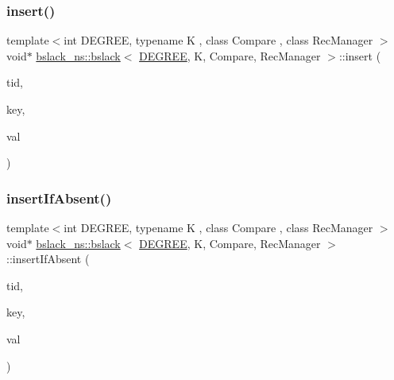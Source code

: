 \subsubsection{\texorpdfstring{insert()}{insert()}}
{\footnotesize\ttfamily template$<$int D\+E\+G\+R\+EE, typename K , class Compare , class Rec\+Manager $>$ \\
void$\ast$ \hyperlink{classbslack__ns_1_1bslack}{bslack\+\_\+ns\+::bslack}$<$ \hyperlink{brown__sigouin__abtree__kcas_2adapter_8h_a5d88b17d70c985f2f2b8e987037fd6dd}{D\+E\+G\+R\+EE}, K, Compare, Rec\+Manager $>$\+::insert (\begin{DoxyParamCaption}\item[{const int}]{tid,  }\item[{const K \&}]{key,  }\item[{void $\ast$const}]{val }\end{DoxyParamCaption})\hspace{0.3cm}{\ttfamily [inline]}}

\mbox{\label{classbslack__ns_1_1bslack_ae62b610f3793dc107e60d54b889771bb}} 
\subsubsection{\texorpdfstring{insert\+If\+Absent()}{insertIfAbsent()}}
{\footnotesize\ttfamily template$<$int D\+E\+G\+R\+EE, typename K , class Compare , class Rec\+Manager $>$ \\
void$\ast$ \hyperlink{classbslack__ns_1_1bslack}{bslack\+\_\+ns\+::bslack}$<$ \hyperlink{brown__sigouin__abtree__kcas_2adapter_8h_a5d88b17d70c985f2f2b8e987037fd6dd}{D\+E\+G\+R\+EE}, K, Compare, Rec\+Manager $>$\+::insert\+If\+Absent (\begin{DoxyParamCaption}\item[{const int}]{tid,  }\item[{const K \&}]{key,  }\item[{void $\ast$const}]{val }\end{DoxyParamCaption})\hspace{0.3cm}{\ttfamily [inline]}}

\mbox{\label{classbslack__ns_1_1bslack_a14f707ac6a74880e2f6923f0b322c93c}} 
